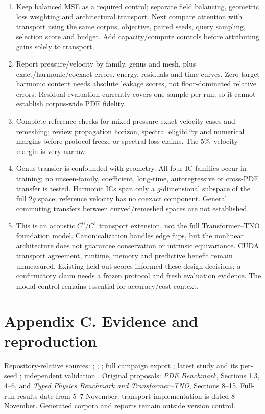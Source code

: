 \documentclass[10pt,a4paper]{article}
\newcommand{\pct}{\%}
\begin{document}
\begin{enumerate}
\item Keep balanced MSE as a required control; separate field balancing, geometric
loss weighting and architectural transport. Next compare attention with transport
using the same corpus, objective, paired seeds, query sampling, selection score and
budget. Add capacity/compute controls before attributing gains solely to transport.
\item Report pressure/velocity by family, genus and mesh, plus exact/harmonic/coexact
errors, energy, residuals and time curves. Zero-target harmonic content needs absolute
leakage scores, not floor-dominated relative errors. Residual evaluation currently
covers one sample per run, so it cannot establish corpus-wide PDE fidelity.
\item Complete reference checks for mixed-pressure exact-velocity cases and remeshing;
review propagation horizon, spectral eligibility and numerical margins before
protocol freeze or spectral-loss claims. The 5\pct\ velocity margin is very narrow.
\item Genus transfer is confounded with geometry. All four IC families occur in
training; no unseen-family, coefficient, long-time, autoregressive or cross-PDE
transfer is tested. Harmonic ICs span only a $g$-dimensional subspace of the full
$2g$ space; reference velocity has no coexact component. General commuting transfers
between curved/remeshed spaces are not established.
\item This is an acoustic $C^0/C^1$ transport extension, not the full Transformer--TNO
foundation model. Canonicalization handles edge flips, but the nonlinear architecture
does not guarantee conservation or intrinsic equivariance. CUDA transport agreement,
runtime, memory and predictive benefit remain unmeasured. Existing held-out scores
informed these design decisions; a confirmatory claim needs a frozen protocol and
fresh evaluation evidence. The modal control remains essential for accuracy/cost context.
\end{enumerate}

\clearpage\section*{Appendix C. Evidence and reproduction}

\small
Repository-relative sources: ; ;
; full campaign export
; latest study
 and its per-seed
; independent validation
.
Original proposals: \textit{PDE Benchmark}, Sections 1.3, 4--6, and
\textit{Typed Physics Benchmark and Transformer--TNO}, Sections 8--15.
Full-run results date from 5--7 November; transport implementation is dated
8 November. Generated corpora and reports remain outside version control.
\end{document}
